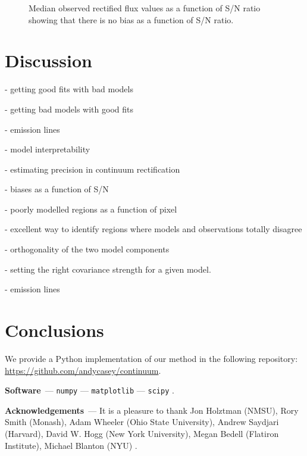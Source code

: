 \documentclass[modern]{aastex631}
\renewcommand{\paragraph}[1]{\medskip\par\noindent\textbf{#1}~---}
\begin{document}
\begin{figure}
    \caption{Median observed rectified flux values as a function of S/N ratio showing that there is no bias as a function of S/N ratio.}
\end{figure}




\section{Discussion}\label{sec:discussion}

- getting good fits with bad models

- getting bad models with good fits

- emission lines

- model interpretability

- estimating precision in continuum rectification

- biases as a function of S/N

- poorly modelled regions as a function of pixel

- excellent way to identify regions where models and observations totally disagree

- orthogonality of the two model components

- setting the right covariance strength for a given model.

- emission lines

\section{Conclusions}
\label{sec:conclusions}



\noindent{}We provide a Python implementation of our method in the following repository: \url{https://github.com/andycasey/continuum}.

\paragraph{Software}
\texttt{numpy} \citep{numpy} ---
\texttt{matplotlib} \citep{matplotlib} ---
\texttt{scipy} \citep{scipy}.

\paragraph{Acknowledgements}
It is a pleasure to thank
    Jon Holztman (NMSU),
    Rory Smith (Monash),
    Adam Wheeler (Ohio State University),
    Andrew Saydjari (Harvard),
    David W. Hogg (New York University),
    Megan Bedell (Flatiron Institute),
    Michael Blanton (NYU)
.

%
\end{document}
